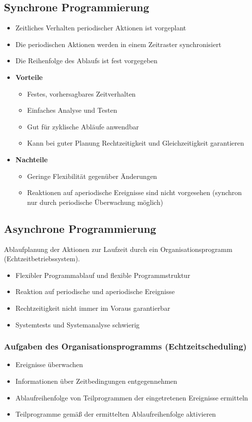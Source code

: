 \subsection{Synchrone Programmierung}
\begin{itemize}
	\item Zeitliches Verhalten periodischer Aktionen ist vorgeplant
	\item Die periodischen Aktionen werden in einem Zeitraster synchronisiert
	\item Die Reihenfolge des Ablaufs ist fest vorgegeben
	\item \textbf{Vorteile}
	\begin{itemize}
		\item Festes, vorhersagbares Zeitverhalten
		\item Einfaches Analyse und Testen
		\item Gut für zyklische Abläufe anwendbar
		\item Kann bei guter Planung Rechtzeitigkeit und Gleichzeitigkeit garantieren
	\end{itemize}
	\item \textbf{Nachteile}
	\begin{itemize}
		\item Geringe Flexibilität gegenüber Änderungen
		\item Reaktionen auf aperiodische Ereignisse sind nicht vorgesehen (synchron nur durch periodische Überwachung möglich)
	\end{itemize}
\end{itemize}


\subsection{Asynchrone Programmierung}
Ablaufplanung der Aktionen zur Laufzeit durch ein Organisationsprogramm (Echtzeitbetriebssystem).

\begin{itemize}
	\item Flexibler Programmablauf und flexible Programmstruktur
	\item Reaktion auf periodische und aperiodische Ereignisse
	\item Rechtzeitigkeit nicht immer im Voraus garantierbar
	\item Systemtests und Systemanalyse schwierig
\end{itemize}

\subsubsection{Aufgaben des Organisationsprogramms (Echtzeitscheduling)}
\begin{itemize}
	\item Ereignisse überwachen
	\item Informationen über Zeitbedingungen entgegennehmen
	\item Ablaufreihenfolge von Teilprogrammen der eingetretenen Ereignisse ermitteln
	\item Teilprogramme gemäß der ermittelten Ablaufreihenfolge aktivieren
\end{itemize}


